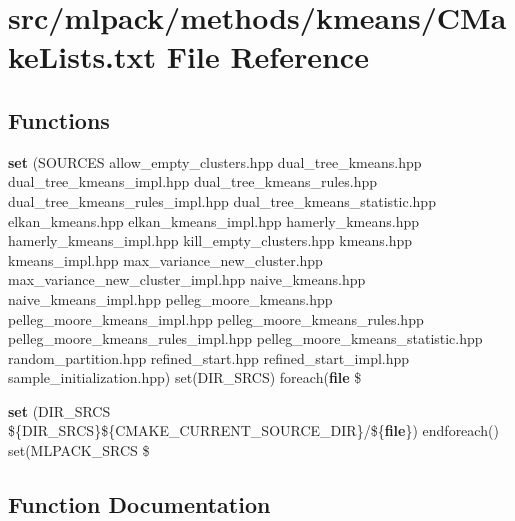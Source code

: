 \section{src/mlpack/methods/kmeans/\+C\+Make\+Lists.txt File Reference}
\label{methods_2kmeans_2CMakeLists_8txt}
\subsection*{Functions}
\begin{DoxyCompactItemize}
\item 
{\bf set} (S\+O\+U\+R\+C\+ES allow\+\_\+empty\+\_\+clusters.\+hpp dual\+\_\+tree\+\_\+kmeans.\+hpp dual\+\_\+tree\+\_\+kmeans\+\_\+impl.\+hpp dual\+\_\+tree\+\_\+kmeans\+\_\+rules.\+hpp dual\+\_\+tree\+\_\+kmeans\+\_\+rules\+\_\+impl.\+hpp dual\+\_\+tree\+\_\+kmeans\+\_\+statistic.\+hpp elkan\+\_\+kmeans.\+hpp elkan\+\_\+kmeans\+\_\+impl.\+hpp hamerly\+\_\+kmeans.\+hpp hamerly\+\_\+kmeans\+\_\+impl.\+hpp kill\+\_\+empty\+\_\+clusters.\+hpp kmeans.\+hpp kmeans\+\_\+impl.\+hpp max\+\_\+variance\+\_\+new\+\_\+cluster.\+hpp max\+\_\+variance\+\_\+new\+\_\+cluster\+\_\+impl.\+hpp naive\+\_\+kmeans.\+hpp naive\+\_\+kmeans\+\_\+impl.\+hpp pelleg\+\_\+moore\+\_\+kmeans.\+hpp pelleg\+\_\+moore\+\_\+kmeans\+\_\+impl.\+hpp pelleg\+\_\+moore\+\_\+kmeans\+\_\+rules.\+hpp pelleg\+\_\+moore\+\_\+kmeans\+\_\+rules\+\_\+impl.\+hpp pelleg\+\_\+moore\+\_\+kmeans\+\_\+statistic.\+hpp random\+\_\+partition.\+hpp refined\+\_\+start.\+hpp refined\+\_\+start\+\_\+impl.\+hpp sample\+\_\+initialization.\+hpp) set(D\+I\+R\+\_\+\+S\+R\+CS) foreach({\bf file} \$
\item 
{\bf set} (D\+I\+R\+\_\+\+S\+R\+CS \$\{D\+I\+R\+\_\+\+S\+R\+CS\}\$\{C\+M\+A\+K\+E\+\_\+\+C\+U\+R\+R\+E\+N\+T\+\_\+\+S\+O\+U\+R\+C\+E\+\_\+\+D\+IR\}/\$\{{\bf file}\}) endforeach() set(M\+L\+P\+A\+C\+K\+\_\+\+S\+R\+CS \$
\end{DoxyCompactItemize}


\subsection{Function Documentation}
